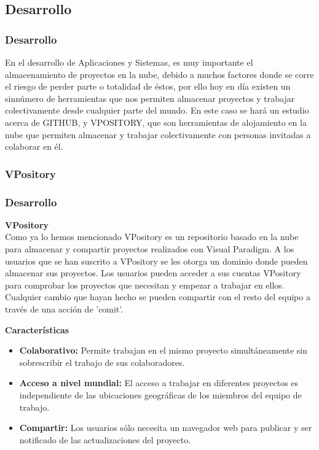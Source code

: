 \documentclass[8pt]{beamer}
\begin{document}
\subsection{Desarrollo}
\begin{frame}
\frametitle{Desarrollo}
En el desarrollo de Aplicaciones y Sistemas, es muy importante el almacenamiento de proyectos en la nube, debido a muchos factores donde se corre el riesgo de perder parte o totalidad de éstos, por ello hoy en día existen un sinnúmero de herramientas que nos permiten almacenar proyectos y trabajar colectivamente desde cualquier parte del mundo. En este caso se hará un estudio acerca de GITHUB, y VPOSITORY, que son herramientas de alojamiento en la nube que permiten almacenar  y trabajar colectivamente con personas invitadas a colaborar en él.
\end{frame}

\subsubsection{VPository}
\begin{frame}
\frametitle{Desarrollo}

\setlength{\parskip}{15pt}
\textbf{VPository}\\
Como ya lo hemos mencionado VPository es un repositorio basado en la nube para almacenar y compartir proyectos realizados con Visual Paradigm. A los usuarios que se han suscrito a VPository se les otorga un dominio donde pueden almacenar sus proyectos. Los usuarios pueden acceder a sus cuentas VPository para comprobar los proyectos que necesitan y empezar a trabajar en ellos. Cualquier cambio que hayan hecho se pueden compartir con el resto del equipo a través de una acción de 'comit'.

\setlength{\parskip}{05pt}
\textbf{Características}\\
\begin{center}
\begin{itemize}
\item{\textbf{Colaborativo:} Permite trabajan en el mismo proyecto simultáneamente sin sobrescribir el trabajo de sus colaboradores.}
\item{\textbf{Acceso a nivel mundial:} El acceso a trabajar en diferentes proyectos es independiente de las ubicaciones geográficas de los miembros del equipo de trabajo.}
\item{\textbf{Compartir:} Los usuarios sólo necesita un navegador web para publicar y ser notificado de las actualizaciones del proyecto.}

\end{itemize}

\end{center}
\end{frame}
\end{document}
